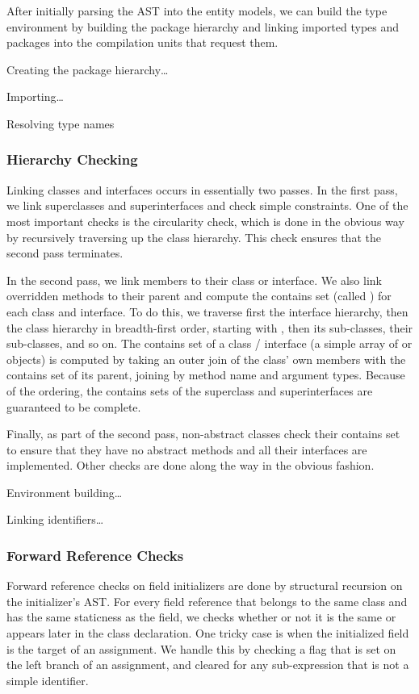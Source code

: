 \documentclass[pdftex,11pt,a4paper]{article}
\begin{document}
After initially parsing the AST into the entity models, we can build
the type environment by building the package hierarchy and linking
imported types and packages into the compilation units that request
them.

Creating the package hierarchy\ldots

Importing\ldots

Resolving type names




\subsubsection{Hierarchy Checking}

Linking classes and interfaces occurs in essentially two passes. In the first
pass, we link superclasses and superinterfaces and check simple constraints. One
of the most important checks is the circularity check, which is done in the
obvious way by recursively traversing up the class hierarchy. This check ensures
that the second pass terminates.

In the second pass, we link members to their class or interface. We also link
overridden methods to their parent and compute the contains set (called
) for each class and interface. To do this, we traverse first
the interface hierarchy, then the class hierarchy in breadth-first order,
starting with , then its sub-classes, their sub-classes,
and so on. The contains set of a class / interface (a simple array of
 or  objects) is computed by taking an outer join of the
class' own members with the contains set of its parent, joining by method name
and argument types. Because of the ordering, the contains sets of the superclass
and superinterfaces are guaranteed to be complete.

Finally, as part of the second pass, non-abstract classes check their contains
set to ensure that they have no abstract methods and all their interfaces are
implemented. Other checks are done along the way in the obvious fashion.


Environment building\ldots


Linking identifiers\ldots


\subsubsection{Forward Reference Checks}

Forward reference checks on field initializers are done by structural recursion
on the initializer's AST. For every field reference that belongs to the same
class and has the same staticness as the field, we checks whether or not it is
the same or appears later in the class declaration. One tricky case is when the
initialized field is the target of an assignment. We handle this by checking a
flag that is set on the left branch of an assignment, and cleared for any
sub-expression that is not a simple identifier.
\end{document}
